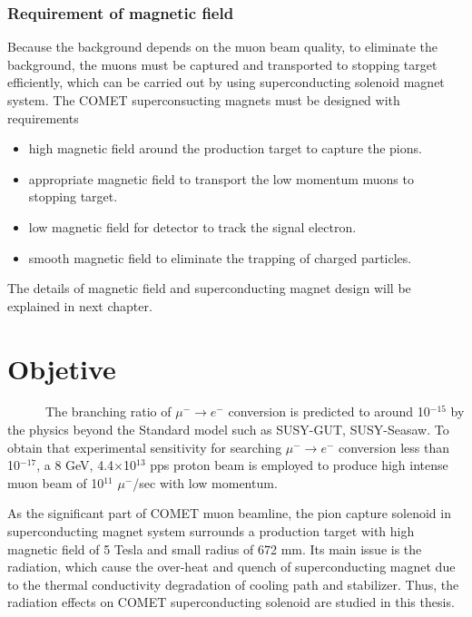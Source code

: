 \subsubsection{Requirement of magnetic field}
Because the background depends on the muon beam quality, to eliminate the background, the muons must be captured and transported to stopping target efficiently, which can be carried out by using superconducting solenoid magnet system.
The COMET superconsucting magnets must be designed with requirements
\begin{itemize}
 \setlength{\itemsep}{-5pt} 
 \item high magnetic field around the production target to capture the pions.
 \item appropriate magnetic field to transport the low momentum muons to stopping target.
 \item low magnetic field for detector to track the signal electron.
 \item smooth magnetic field to eliminate the trapping of charged particles.
\end{itemize}
The details of magnetic field and superconducting magnet design will be explained in next chapter.

\section{Objetive}
~~~~~~The branching ratio of $\mu^- \rightarrow e^-$ conversion is predicted to around 10$^{-15}$ by the physics beyond the Standard model such as SUSY-GUT, SUSY-Seasaw.
To obtain that experimental sensitivity for searching $\mu^- \rightarrow e^-$ conversion less than 10$^{-17}$, a 8 GeV, 4.4$\times$10$^{13}$ pps proton beam is employed to produce high intense muon beam of 10$^{11}$ $\mu^-$/sec with low momentum.

As the significant part of COMET muon beamline, the pion capture solenoid in superconducting magnet system surrounds a production target with high magnetic field of 5 Tesla and small radius of 672 mm.
Its main issue is the radiation, which cause the over-heat and quench of superconducting magnet due to the thermal conductivity degradation of cooling path and stabilizer.
Thus, the radiation effects on COMET superconducting solenoid are studied in this thesis.

